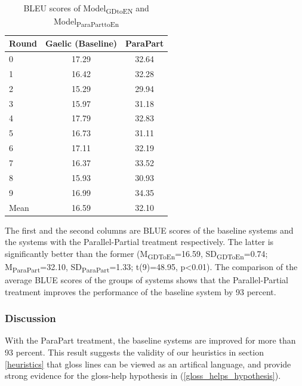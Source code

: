 \documentclass[final]{ua-thesis}
\numberwithin{equation}{section}
\begin{document}
\begin{table}[ht]
\centering
\begin{tabular}{lcc}
  \hline
Round & Gaelic (Baseline) & ParaPart \\ 
  \hline
0 & 17.29 & 32.64 \\ 
  1 & 16.42 & 32.28 \\ 
  2 & 15.29 & 29.94 \\ 
  3 & 15.97 & 31.18 \\ 
  4 & 17.79 & 32.83 \\ 
  5 & 16.73 & 31.11 \\ 
  6 & 17.11 & 32.19 \\ 
  7 & 16.37 & 33.52 \\ 
  8 & 15.93 & 30.93 \\ 
  9 & 16.99 & 34.35 \\ 
   \hline
Mean & 16.59 & 32.10 \\ 
   \hline
\end{tabular}
\caption{BLEU scores of Model\textsubscript{GDtoEN} and Model\textsubscript{ParaParttoEn}} 
\label{Table:ParaPart}
\end{table}
The first and the second columns are BLUE scores of the baseline systems and the systems with the Parallel-Partial treatment respectively. The latter is significantly better than the former
(M\textsubscript{GDToEn}=16.59, SD\textsubscript{GDToEn}=0.74; M\textsubscript{ParaPart}=32.10, SD\textsubscript{ParaPart}=1.33; t(9)=48.95, p<0.01).
The comparison of the average BLUE scores of the groups of systems shows that the Parallel-Partial treatment improves the performance of the baseline system by 93 percent.
\subsubsection{Discussion}
With the ParaPart treatment, the baseline systems are improved for more than 93 percent. This result suggests the validity of our heuristics in section \ref{heuristics} that gloss lines can be viewed as an artifical language, and provide strong evidence for the gloss-help hypothesis in (\ref{gloss_helps_hypothesis}).     


\end{document}
